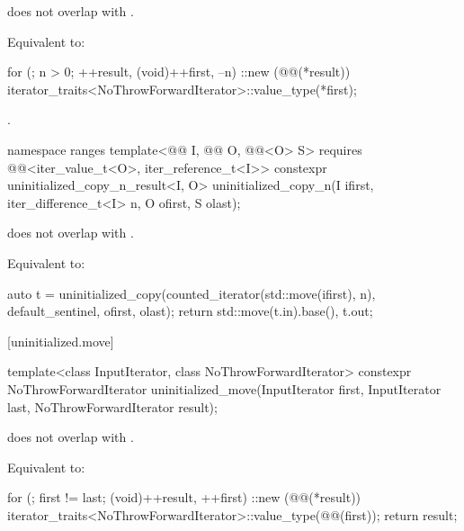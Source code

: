 \begin{itemdescr}
\pnum
\expects
{} does not overlap with .

\pnum
\effects
Equivalent to:
\begin{codeblock}
for (; n > 0; ++result, (void)++first, --n)
  ::new (@@(*result)) iterator_traits<NoThrowForwardIterator>::value_type(*first);
\end{codeblock}

\pnum
\returns
{}.
\end{itemdescr}

%
\begin{itemdecl}
namespace ranges {
  template<@@ I, @@ O, @@<O> S>
    requires @@<iter_value_t<O>, iter_reference_t<I>>
    constexpr uninitialized_copy_n_result<I, O>
      uninitialized_copy_n(I ifirst, iter_difference_t<I> n, O ofirst, S olast);
}
\end{itemdecl}

\begin{itemdescr}
\pnum
\expects
{} does not overlap with
.

\pnum
\effects
Equivalent to:
\begin{codeblock}
auto t = uninitialized_copy(counted_iterator(std::move(ifirst), n),
                            default_sentinel, ofirst, olast);
return {std::move(t.in).base(), t.out};
\end{codeblock}
\end{itemdescr}

[uninitialized.move]{}

%
\begin{itemdecl}
template<class InputIterator, class NoThrowForwardIterator>
  constexpr NoThrowForwardIterator uninitialized_move(InputIterator first, InputIterator last,
                                                      NoThrowForwardIterator result);
\end{itemdecl}

\begin{itemdescr}
\pnum
\expects
{} does not overlap with .

\pnum
\effects
Equivalent to:
\begin{codeblock}
for (; first != last; (void)++result, ++first)
  ::new (@@(*result))
    iterator_traits<NoThrowForwardIterator>::value_type(@@(first));
return result;
\end{codeblock}
\end{itemdescr}

